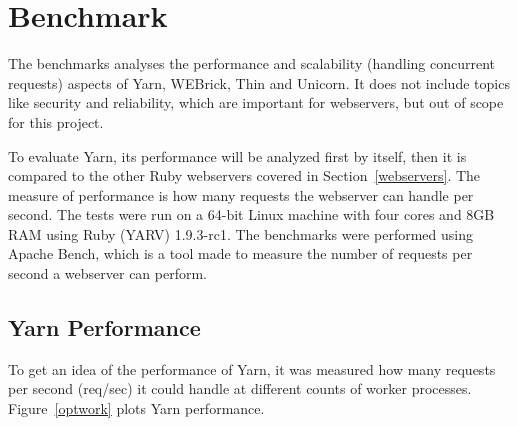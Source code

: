 \section{Benchmark}
\label{eval}
The benchmarks analyses the performance and scalability (handling
concurrent requests) aspects of Yarn, WEBrick, Thin and Unicorn. It does not
include topics like security and reliability, which are important for
webservers, but out of scope for this project.

To evaluate Yarn, its performance will be analyzed first by itself, then it
is compared to the other Ruby webservers covered in Section~\ref{webservers}.
The measure of performance is how many requests the webserver can handle per
second. The tests were run on a 64-bit Linux machine with four cores and 8GB
RAM using Ruby (YARV) 1.9.3-rc1. The benchmarks were performed using Apache
Bench, which is a tool made to measure the number of requests per second a
webserver can perform.

\subsection{Yarn Performance}
To get an idea of the performance of Yarn, it was measured how many requests
per second (req/sec) it could handle at different counts of worker processes.
Figure~\ref{optwork} plots Yarn performance.

